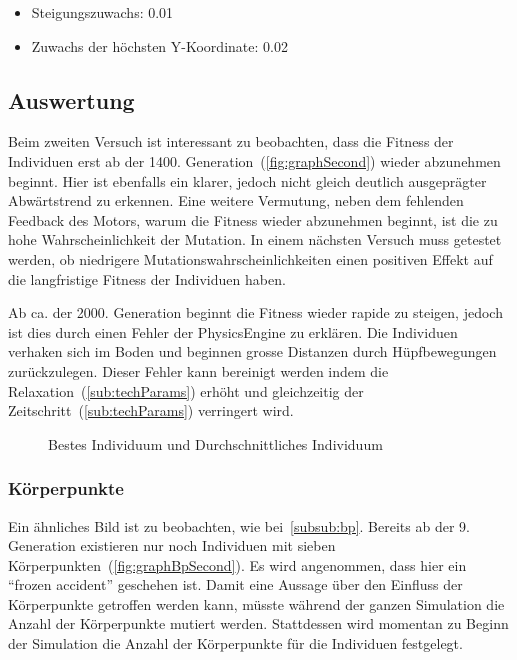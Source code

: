       \begin{itemize}
        \item Steigungszuwachs: 0.01
        \item Zuwachs der höchsten Y-Koordinate: 0.02
      \end{itemize}

    \subsection{Auswertung\label{sub:scndAuswertung}}

      Beim zweiten Versuch ist interessant zu beobachten,
      dass die Fitness der Individuen erst ab der 1400\@. Generation~(\vref{fig:graphSecond})
      wieder abzunehmen beginnt.
      Hier ist ebenfalls ein klarer, jedoch nicht gleich deutlich ausgeprägter Abwärtstrend zu erkennen.
      Eine weitere Vermutung, neben dem fehlenden Feedback des Motors, warum die Fitness wieder abzunehmen beginnt,
      ist die zu hohe Wahrscheinlichkeit der Mutation.
      In einem nächsten Versuch muss getestet werden,
      ob niedrigere Mutationswahrscheinlichkeiten einen positiven Effekt auf die langfristige Fitness der Individuen haben.

      \medskip

      Ab ca\@. der 2000\@. Generation beginnt die Fitness wieder rapide zu steigen,
      jedoch ist dies durch einen Fehler der \gls{PhysicsEngine} zu erklären.
      Die Individuen verhaken sich im Boden und beginnen grosse Distanzen durch Hüpfbewegungen zurückzulegen.
      Dieser Fehler kann bereinigt werden indem die Relaxation~(\vref{sub:techParams}) erhöht und
      gleichzeitig der Zeitschritt~(\vref{sub:techParams}) verringert wird.

      \begin{figure}[H]
        \centering
        
        \caption{Bestes Individuum und Durchschnittliches Individuum\label{fig:graphSecond}}
      \end{figure}

      \subsubsection{Körperpunkte\label{subsub:bpScnd}}

        Ein ähnliches Bild ist zu beobachten, wie bei~\vref{subsub:bp}.
        Bereits ab der 9\@. Generation existieren nur noch Individuen mit sieben Körperpunkten~(\vref{fig:graphBpSecond}).
        Es wird angenommen, dass hier ein ``frozen accident'' geschehen ist.
        Damit eine Aussage über den Einfluss der Körperpunkte getroffen werden kann,
        müsste während der ganzen Simulation die Anzahl der Körperpunkte mutiert werden.
        Stattdessen wird momentan zu Beginn der Simulation die Anzahl der Körperpunkte für die Individuen festgelegt.

